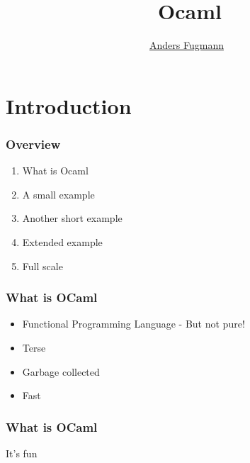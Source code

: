 \documentclass[xcolor=svgnames]{beamer}
\renewcommand{\_}{\mathunderscore}
\begin{document}
\title[Introduction to OCaml]{\
  Ocaml
}
\author[Anders Fugmann]{\
  \normalfont \underline{Anders Fugmann}
}
\date{}

\maketitle

\section{Introduction}

\begin{frame}
  \frametitle{Overview}

  \begin{enumerate}
  \item What is Ocaml
  \item A small example
  \item Another short example
  \item Extended example
  \item Full scale
  \end{enumerate}

\end{frame}

\begin{frame}[fragile]
   \frametitle{What is OCaml}
   \begin{itemize}
   \item Functional Programming Language - But not pure!
   \item Terse
   \item Garbage collected
   \item Fast
   \end{itemize}
\end{frame}

\begin{frame}[fragile]
  \frametitle{What is OCaml}
  \begin{center}
    \Huge It's fun
  \end{center}
\end{frame}

\end{document}
